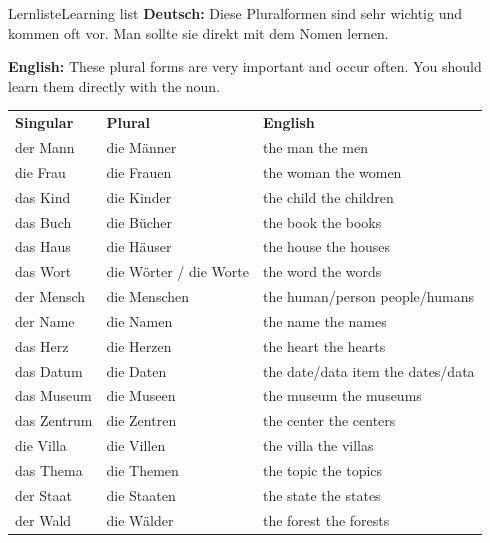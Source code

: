 \documentclass[a4paper,11pt]{article}
\newcommand{\GermanText}[1]{\textbf{Deutsch: }#1\par}
\newcommand{\EnglishText}[1]{{\small\color{SoftGray}\textbf{English: }#1\par}}
\newcommand{\TableHead}[3]{\rowcolor{HeaderBlueDark}\color{white}\textbf{#1} & \color{white}\textbf{#2} & \color{white}\textbf{#3}\\}
\begin{document}
\begin{grammarentry}{Lernliste}{Learning list}
\GermanText{Diese Pluralformen sind sehr wichtig und kommen oft vor. Man sollte sie direkt mit dem Nomen lernen.}
\EnglishText{These plural forms are very important and occur often. You should learn them directly with the noun.}

\begin{longtable}{>{\RaggedRight\arraybackslash}p{}>{\RaggedRight\arraybackslash}p{}>{\RaggedRight\arraybackslash}p{}}
\TableHead{Singular}{Plural}{English}
\rowcolor{RowBlueLight} der Mann & die Männer & the man \textrightarrow{} the men \\
\rowcolor{RowBlueDark} die Frau & die Frauen & the woman \textrightarrow{} the women \\
\rowcolor{RowBlueLight} das Kind & die Kinder & the child \textrightarrow{} the children \\
\rowcolor{RowBlueDark} das Buch & die Bücher & the book \textrightarrow{} the books \\
\rowcolor{RowBlueLight} das Haus & die Häuser & the house \textrightarrow{} the houses \\
\rowcolor{RowBlueDark} das Wort & die Wörter / die Worte & the word \textrightarrow{} the words \\
\rowcolor{RowBlueLight} der Mensch & die Menschen & the human/person \textrightarrow{} people/humans \\
\rowcolor{RowBlueDark} der Name & die Namen & the name \textrightarrow{} the names \\
\rowcolor{RowBlueLight} das Herz & die Herzen & the heart \textrightarrow{} the hearts \\
\rowcolor{RowBlueDark} das Datum & die Daten & the date/data item \textrightarrow{} the dates/data \\
\rowcolor{RowBlueLight} das Museum & die Museen & the museum \textrightarrow{} the museums \\
\rowcolor{RowBlueDark} das Zentrum & die Zentren & the center \textrightarrow{} the centers \\
\rowcolor{RowBlueLight} die Villa & die Villen & the villa \textrightarrow{} the villas \\
\rowcolor{RowBlueDark} das Thema & die Themen & the topic \textrightarrow{} the topics \\
\rowcolor{RowBlueLight} der Staat & die Staaten & the state \textrightarrow{} the states \\
\rowcolor{RowBlueDark} der Wald & die Wälder & the forest \textrightarrow{} the forests \\
\end{longtable}
\end{grammarentry}
\end{document}
